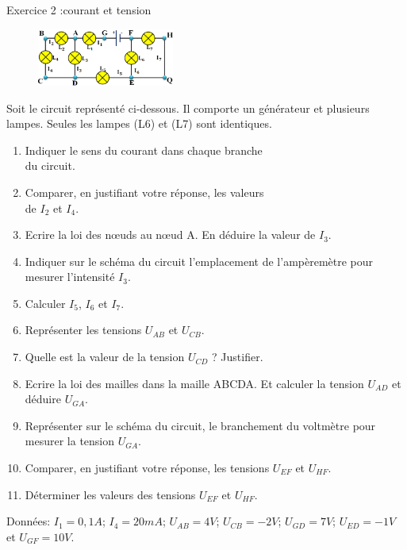 \documentclass[12pt, french]{article}
\begin{document}
\begin{Box2}{Exercice 2 :courant et tension}

	\begin{figure}
  \begin{center}
	  \includegraphics[width=0.4\textwidth]{./img/ex01.png}
  \end{center}
\end{figure}
Soit le circuit représenté ci-dessous. Il
comporte un générateur et plusieurs lampes.
Seules les lampes (L6) et (L7) sont identiques.



	\begin{enumerate}
		\item Indiquer le sens du courant dans chaque
branche \\du circuit.
\item  Comparer, en justifiant votre réponse, les
valeurs \\de $I_2$ et $I_4$.
\item  Ecrire la loi des nœuds au nœud A. En déduire la valeur de $I_3$.
\item Indiquer sur le schéma du circuit l’emplacement de l’ampèremètre pour mesurer l’intensité $I_3$.
\item  Calculer $I_5$, $I_6$ et $I_7$.
\item  Représenter les tensions $U_{AB}$ et $U_{CB}$.
\item  Quelle est la valeur de la tension $U_{CD}$ ? Justifier.
\item  Ecrire la loi des mailles dans la maille ABCDA. Et calculer la tension $U_{AD}$ et déduire $U_{GA}$.
\item  Représenter sur le schéma du circuit, le branchement du voltmètre pour mesurer la tension $U_{GA}$.
\item Comparer, en justifiant votre réponse, les tensions $U_{EF}$ et $U_{HF}$.
\item Déterminer les valeurs des tensions $U_{EF}$ et $U_{HF}$.
\end{enumerate}

Données: $I_1 = 0,1A$; $I_4 = 20 mA$; $U_{AB} = 4 V$; $U_{CB} = - 2 V$; $U_{GD} = 7 V$; $U_{ED} = - 1 V$ et $U_{GF} = 10 V$.


\end{Box2}
\end{document}
